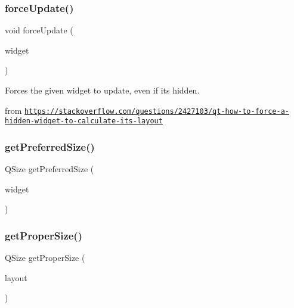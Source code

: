 \subsubsection{\texorpdfstring{force\+Update()}{forceUpdate()}\hspace{0.1cm}{\footnotesize\ttfamily [2/2]}}
{\footnotesize\ttfamily void force\+Update (\begin{DoxyParamCaption}\item[{Q\+Widget $\ast$}]{widget }\end{DoxyParamCaption})\hspace{0.3cm}{\ttfamily [static]}}



Forces the given widget to update, even if it\textquotesingle{}s hidden. 

from \href{https://stackoverflow.com/questions/2427103/qt-how-to-force-a-hidden-widget-to-calculate-its-layout}{\tt https\+://stackoverflow.\+com/questions/2427103/qt-\/how-\/to-\/force-\/a-\/hidden-\/widget-\/to-\/calculate-\/its-\/layout} \mbox{\label{classGLayout_abed90e2fba621607c8e0bc64a63c055a}} 
\subsubsection{\texorpdfstring{get\+Preferred\+Size()}{getPreferredSize()}}
{\footnotesize\ttfamily Q\+Size get\+Preferred\+Size (\begin{DoxyParamCaption}\item[{Q\+Widget $\ast$}]{widget }\end{DoxyParamCaption})\hspace{0.3cm}{\ttfamily [static]}}

\mbox{\label{classGLayout_ab02e7752b1782d032d9ded3c1105e647}} 
\subsubsection{\texorpdfstring{get\+Proper\+Size()}{getProperSize()}\hspace{0.1cm}{\footnotesize\ttfamily [1/2]}}
{\footnotesize\ttfamily Q\+Size get\+Proper\+Size (\begin{DoxyParamCaption}\item[{Q\+Layout $\ast$}]{layout }\end{DoxyParamCaption})\hspace{0.3cm}{\ttfamily [static]}}

